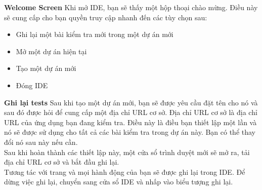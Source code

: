 \textbf{Welcome Screen}
Khi mở IDE, bạn sẽ thấy một hộp thoại chào mừng. Điều này sẽ cung cấp cho bạn quyền truy cập nhanh đến các tùy chọn sau:
\begin{itemize}
    \item Ghi lại một bài kiểm tra mới trong một dự án mới
    \item Mở một dự án hiện tại
    \item Tạo một dự án mới
    \item Đóng IDE
\end{itemize}

\textbf{Ghi lại tests}
Sau khi tạo một dự án mới, bạn sẽ được yêu cầu đặt tên cho nó và sau đó được hỏi để cung cấp một địa chỉ URL cơ sở. Địa chỉ URL cơ sở là địa chỉ URL của ứng dụng bạn đang kiểm tra. Điều này là điều bạn thiết lập một lần và nó sẽ được sử dụng cho tất cả các bài kiểm tra trong dự án này. Bạn có thể thay đổi nó sau này nếu cần. \\

Sau khi hoàn thành các thiết lập này, một cửa sổ trình duyệt mới sẽ mở ra, tải địa chỉ URL cơ sở và bắt đầu ghi lại. \\

Tương tác với trang và mọi hành động của bạn sẽ được ghi lại trong IDE. Để dừng việc ghi lại, chuyển sang cửa sổ IDE và nhấp vào biểu tượng ghi lại. 


